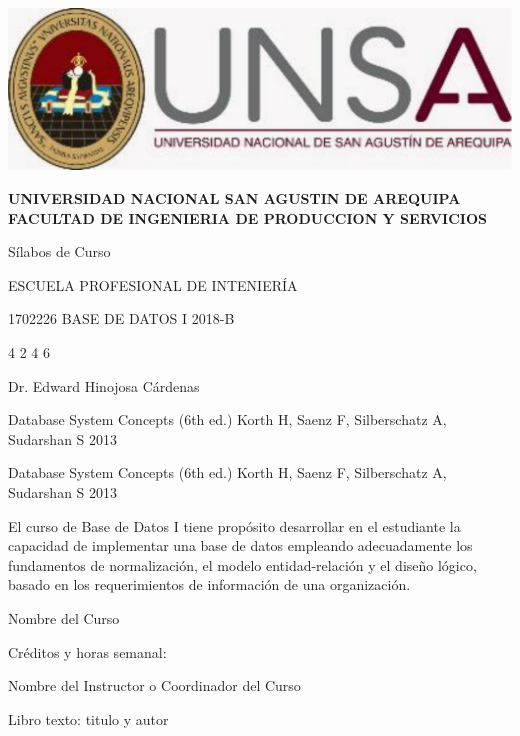 \documentclass[12pt]{article}
\begin{document}
\begin{minipage}[c]{0.33\linewidth}
\includegraphics[scale=0.13]{images/image001.png}
\end{minipage} 
\begin{minipage}[c]{0.75\linewidth}
\begin{center}

\textbf{UNIVERSIDAD NACIONAL SAN AGUSTIN DE AREQUIPA
FACULTAD DE INGENIERIA DE PRODUCCION Y SERVICIOS}
\end{center}


\end{minipage}


Sílabos de Curso

ESCUELA PROFESIONAL DE INTENIERÍA

\curso
{1702226} %
{BASE DE DATOS I} %
{2018-B} %

\creditosHoras
{4} %
{2} %
{} %
{} %
{4} %
{6} %

\instructor
{Dr. Edward Hinojosa Cárdenas}

\libro
{Database System Concepts (6th ed.)} %
{Korth H, Saenz F, Silberschatz A, Sudarshan S} %
{2013} %

\libroSecundario
{Database System Concepts (6th ed.)} %
{Korth H, Saenz F, Silberschatz A, Sudarshan S} %
{2013} %

\begin{datosCurso}
    \begin{descripcion}
        El curso de Base de Datos I tiene propósito desarrollar en el estudiante la capacidad de implementar una base de datos empleando adecuadamente los fundamentos de normalización, el modelo entidad-relación y el diseño lógico, basado en los requerimientos de información de una organización.
    \end{descripcion}
\end{datosCurso}

Nombre del Curso

Créditos y horas semanal:

Nombre del Instructor o Coordinador del Curso

Libro texto: titulo y autor
\end{document}
